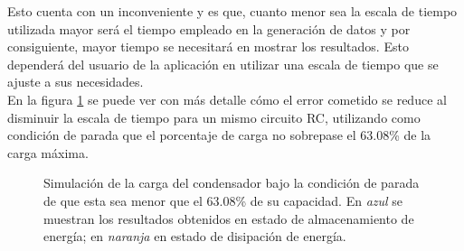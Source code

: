 \documentclass[../main.tex]{subfiles}
\begin{document}
Esto cuenta con un inconveniente y es que, cuanto menor sea la escala de tiempo utilizada mayor será el tiempo empleado en la generación de datos y por consiguiente, mayor tiempo se necesitará en mostrar los resultados. Esto dependerá del usuario de la aplicación en utilizar una escala de tiempo que se ajuste a sus necesidades.\\

En la figura \ref{fig::condiciones-de-parada} se puede ver con más detalle cómo el error cometido se reduce al disminuir la escala de tiempo para un mismo circuito RC, utilizando como condición de parada que el porcentaje de carga no sobrepase el 63.08\% de la carga máxima.\\ 


\begin{figure}[!h]
    \centering
    \quad


    \caption{Simulación de la carga del condensador bajo la condición de parada de que esta sea menor que el 63.08\% de su capacidad. En \textit{azul} se muestran los resultados obtenidos en estado de almacenamiento de energía; en \textit{naranja} en estado de disipación de energía.}

    \label{fig::condiciones-de-parada}
\end{figure}
\end{document}
